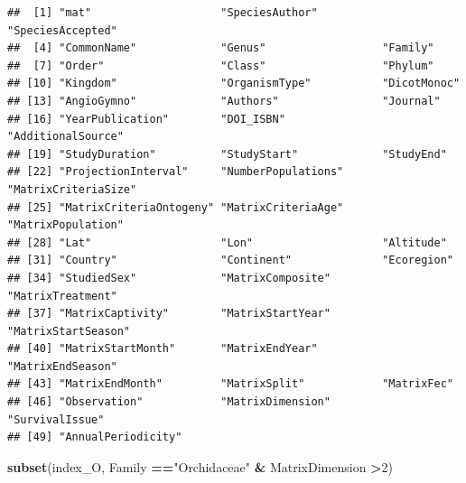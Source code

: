\documentclass[
]{book}
\newenvironment{Shaded}{\begin{snugshade}}{\end{snugshade}}
\newcommand{\DecValTok}[1]{\textcolor[rgb]{0.00,0.00,0.81}{#1}}
\newcommand{\FunctionTok}[1]{\textcolor[rgb]{0.13,0.29,0.53}{\textbf{#1}}}
\newcommand{\NormalTok}[1]{#1}
\newcommand{\SpecialCharTok}[1]{\textcolor[rgb]{0.81,0.36,0.00}{\textbf{#1}}}
\newcommand{\StringTok}[1]{\textcolor[rgb]{0.31,0.60,0.02}{#1}}
\theoremstyle{definition}
\theoremstyle{definition}
\theoremstyle{definition}
\theoremstyle{definition}
\theoremstyle{remark}
\begin{document}
\begin{verbatim}
##  [1] "mat"                    "SpeciesAuthor"          "SpeciesAccepted"       
##  [4] "CommonName"             "Genus"                  "Family"                
##  [7] "Order"                  "Class"                  "Phylum"                
## [10] "Kingdom"                "OrganismType"           "DicotMonoc"            
## [13] "AngioGymno"             "Authors"                "Journal"               
## [16] "YearPublication"        "DOI_ISBN"               "AdditionalSource"      
## [19] "StudyDuration"          "StudyStart"             "StudyEnd"              
## [22] "ProjectionInterval"     "NumberPopulations"      "MatrixCriteriaSize"    
## [25] "MatrixCriteriaOntogeny" "MatrixCriteriaAge"      "MatrixPopulation"      
## [28] "Lat"                    "Lon"                    "Altitude"              
## [31] "Country"                "Continent"              "Ecoregion"             
## [34] "StudiedSex"             "MatrixComposite"        "MatrixTreatment"       
## [37] "MatrixCaptivity"        "MatrixStartYear"        "MatrixStartSeason"     
## [40] "MatrixStartMonth"       "MatrixEndYear"          "MatrixEndSeason"       
## [43] "MatrixEndMonth"         "MatrixSplit"            "MatrixFec"             
## [46] "Observation"            "MatrixDimension"        "SurvivalIssue"         
## [49] "AnnualPeriodicity"
\end{verbatim}

\begin{Shaded}
\begin{Highlighting}[]
\FunctionTok{subset}\NormalTok{(index\_O, Family }\SpecialCharTok{==}\StringTok{"Orchidaceae"}  \SpecialCharTok{\&}
\NormalTok{             MatrixDimension }\SpecialCharTok{\textgreater{}}\DecValTok{2}\NormalTok{)}
\end{Highlighting}
\end{Shaded}
\end{document}
